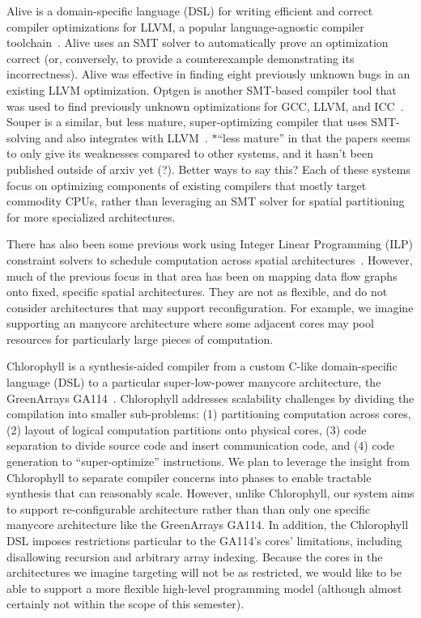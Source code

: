 \documentclass{sig-alternate-05-2015}
\newcommand{\note}{\color{red}$*$}
\begin{document}
Alive is a domain-specific language (DSL) for writing efficient and correct compiler optimizations for LLVM, a popular language-agnostic compiler toolchain~\cite{alive}. Alive uses an SMT solver to automatically prove an optimization correct (or, conversely, to provide a counterexample demonstrating its incorrectness). Alive was effective in finding eight previously unknown bugs in an existing LLVM optimization. Optgen is another SMT-based compiler tool that was used to find previously unknown optimizations for GCC, LLVM, and ICC~\cite{optgen}. Souper is a similar, but less mature, super-optimizing compiler that uses SMT-solving and also integrates with LLVM~\cite{souper}. {\note ``less mature'' in that the papers seems to only give its weaknesses compared to other systems, and it hasn't been published outside of arxiv yet (?). Better ways to say this?} Each of these systems focus on optimizing components of existing compilers that mostly target commodity CPUs, rather than leveraging an SMT solver for spatial partitioning for more specialized architectures.

There has also been some previous work using Integer Linear Programming (ILP) constraint solvers to schedule computation across spatial architectures~\cite{ilp}. However, much of the previous focus in that area has been on mapping data flow graphs onto fixed, specific spatial architectures. They are not as flexible, and do not consider architectures that may support reconfiguration. For example, we imagine supporting an manycore architecture where some adjacent cores may pool resources for particularly large pieces of computation. 

Chlorophyll is a synthesis-aided compiler from a custom C-like domain-specific language (DSL) to a particular super-low-power manycore architecture, the GreenArrays GA114~\cite{chlorophyll}. Chlorophyll addresses scalability challenges by dividing the compilation into smaller sub-problems: (1) partitioning computation across cores, (2) layout of logical computation partitions onto physical cores, (3) code separation to divide source code and insert communication code, and (4) code generation to ``super-optimize'' instructions. We plan to leverage the insight from Chlorophyll to separate compiler concerns into phases to enable tractable synthesis that can reasonably scale. However, unlike Chlorophyll, our system aims to support re-configurable architecture rather than than only one specific manycore architecture like the GreenArrays GA114. In addition, the Chlorophyll DSL imposes restrictions particular to the GA114's cores' limitations, including disallowing recursion and arbitrary array indexing. Because the cores in the architectures we imagine targeting will not be as restricted, we would like to be able to support a more flexible high-level programming model (although almost certainly not within the scope of this semester). 
\end{document}
